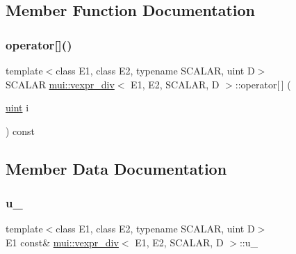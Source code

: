 \subsection{Member Function Documentation}
\mbox{\label{structmui_1_1vexpr__div_a4deed6d70b9017bbb9fd9dfa1cb127bd}} 
\subsubsection{\texorpdfstring{operator[]()}{operator[]()}}
{\footnotesize\ttfamily template$<$class E1, class E2, typename S\+C\+A\+L\+AR, uint D$>$ \\
S\+C\+A\+L\+AR \hyperlink{structmui_1_1vexpr__div}{mui\+::vexpr\+\_\+div}$<$ E1, E2, S\+C\+A\+L\+AR, D $>$\+::operator\mbox{[}$\,$\mbox{]} (\begin{DoxyParamCaption}\item[{\hyperlink{namespacemui_af15a3e7188a2117fb9965277bb0cacd2}{uint}}]{i }\end{DoxyParamCaption}) const\hspace{0.3cm}{\ttfamily [inline]}}



\subsection{Member Data Documentation}
\mbox{\label{structmui_1_1vexpr__div_aa04d0e1d2c211f12c41a0612103f52fc}} 
\subsubsection{\texorpdfstring{u\+\_\+}{u\_}}
{\footnotesize\ttfamily template$<$class E1, class E2, typename S\+C\+A\+L\+AR, uint D$>$ \\
E1 const\& \hyperlink{structmui_1_1vexpr__div}{mui\+::vexpr\+\_\+div}$<$ E1, E2, S\+C\+A\+L\+AR, D $>$\+::u\+\_\+\hspace{0.3cm}{\ttfamily [protected]}}

\mbox{\label{structmui_1_1vexpr__div_aab2211da5c1741663c3c1bfcc76cdb57}} 
